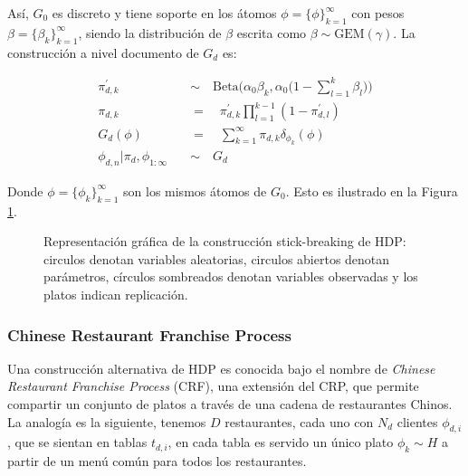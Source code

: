 Así, $G_{0}$ es discreto y tiene soporte en los átomos $\phi = \{\phi\}_{k=1}^{\infty}$ con pesos $\beta=\{\beta_{k}\}_{k=1}^{\infty}$, siendo la distribución de $\beta$ escrita como $\beta \sim \text{GEM}(\gamma)$. La construcción a nivel documento de $G_{d}$ es:

\begin{align}
    \pi_{d,k}^{'} \quad &\sim \quad \text{Beta}\big(\alpha_{0}\beta_{k}, \alpha_{0}\big(1-\sum_{l=1}^{k}\beta_{l}\big)\big)\\
    \pi_{d,k} \quad &= \quad \pi_{d,k}^{'}\prod_{l=1}^{k-1}(1-\pi_{d,l}^{'})\\
    G_{d}(\phi) \quad &= \quad\sum_{k=1}^{\infty}\pi_{d,k}\delta_{\phi_{k}}(\phi)\\
    \phi_{d,n}|\pi_{d}, \phi_{1:\infty} \quad &\sim \quad G_{d}
\end{align}

Donde $\phi = \{\phi_{k}\}_{k=1}^{\infty}$ son los mismos átomos de $G_{0}$. Esto es ilustrado en la Figura \ref{img:hdp_sbc}.

\begin{figure}
  \centering
\caption{Representación gráfica de la construcción stick-breaking de HDP: circulos denotan variables aleatorias, circulos abiertos denotan parámetros, círculos sombreados denotan variables observadas y los platos indican replicación.}
\label{img:hdp_sbc}
\end{figure}

\subsubsection{Chinese Restaurant Franchise Process}
Una construcción alternativa de HDP es conocida bajo el nombre de \textit{Chinese Restaurant Franchise Process} (CRF), una extensión del CRP, que permite compartir un conjunto de platos a través de una cadena de restaurantes Chinos. La analogía es la siguiente, tenemos $D$ restaurantes, cada uno con $N_{d}$ clientes $\phi_{d,i}$, que se sientan en tablas $t_{d,i}$, en cada tabla es servido un único plato $\phi_{k}\sim H$ a partir de un menú común para todos los restaurantes. \\

